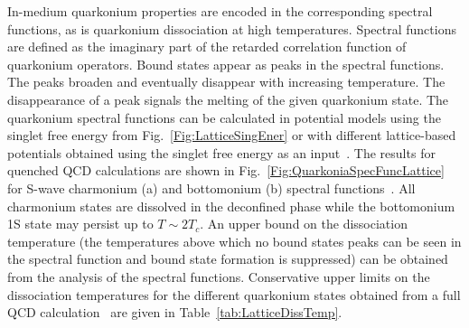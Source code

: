 In-medium quarkonium properties are encoded in the corresponding 
spectral functions, as is quarkonium dissociation
at high temperatures. Spectral functions are defined as
the imaginary part of the retarded correlation function of quarkonium
operators. Bound states appear as peaks in the spectral functions.
The peaks broaden and eventually disappear with
increasing temperature. The disappearance of a peak signals the melting of 
the given quarkonium state.
The quarkonium spectral functions can be calculated in potential models 
using the singlet free energy from Fig.~\ref{Fig:LatticeSingEner} or with different 
lattice-based potentials obtained using the singlet free energy
as an input~\cite{Mocsy:2007yj,Mocsy:2007jz}. 
The results for quenched QCD calculations are shown in Fig.~\ref{Fig:QuarkoniaSpecFuncLattice}
for S-wave charmonium (a) and bottomonium (b) 
spectral functions~\cite{Mocsy:2007yj}.
All charmonium states are dissolved in the deconfined phase while the bottomonium 1S
state may persist up to $T \sim 2T_c$. An upper bound on the dissociation temperature 
(the temperatures above which no
bound states peaks can be seen in the spectral function and bound state 
formation is suppressed) can be obtained from the analysis of the spectral 
functions. Conservative upper limits on the dissociation
temperatures for the different quarkonium states obtained from 
a full QCD calculation~\cite{Mocsy:2007jz} are given in Table~\ref{tab:LatticeDissTemp}.

